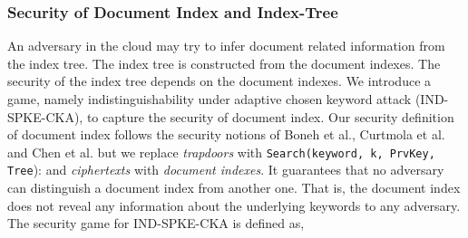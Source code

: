 \documentclass[sigconf,pdftex]{acmart}
\begin{document}
\subsubsection{Security of Document Index and Index-Tree}


 An adversary in the cloud may try to infer document related information from the index tree. The index tree is constructed from the document indexes. The security of the index tree depends on the document indexes. We introduce a game, namely indistinguishability under adaptive chosen keyword attack (IND-SPKE-CKA), to capture the security of document index. Our security definition of document index follows the security notions of Boneh et al.\cite{boneh2004public}, Curtmola et al.\cite{curtmola2006} and Chen et al.\cite{chen2015new} but we replace \textit{trapdoors} with {\texttt{Search(keyword, k, PrvKey, Tree}):} and \textit{ciphertexts} with \textit{document indexes}. It guarantees that no adversary can distinguish a document index from another one. That is, the document index does not reveal any information about the underlying keywords to any adversary.  The security game for IND-SPKE-CKA is defined as,
\end{document}
